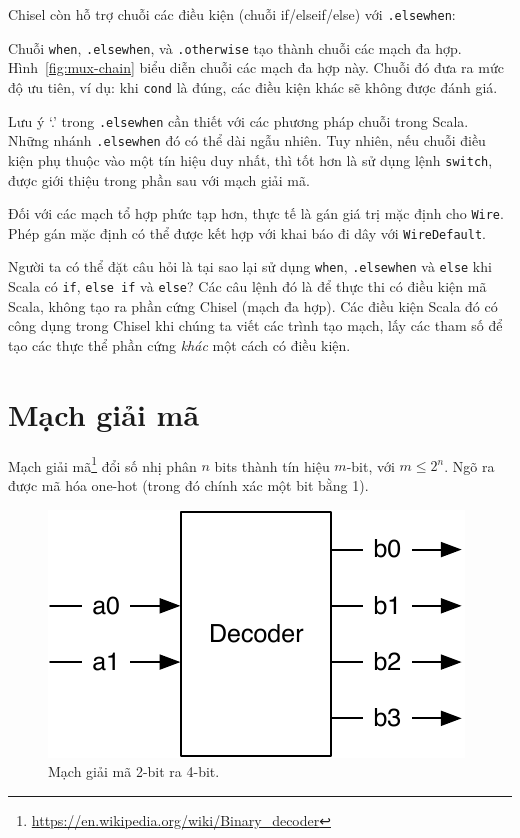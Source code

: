 \documentclass[%
    10pt,
    headinclude, footexclude,
    openright, %
    notitlepage,
    cleardoubleempty,
    headsepline,
    pointlessnumbers,
    bibtotoc, idxtotoc,
    ]{scrbook}
\newcommand{\code}[1]{{\small{\texttt{#1}}}}
\newcommand{\scale}{0.7}
\newcommand{\myref}[2]{\href{#1}{#2}}
\renewcommand{\myref}[2]{{#2}{\footnote{\url{#1}}}}
\begin{document}
Chisel còn hỗ trợ chuỗi các điều kiện (chuỗi if/elseif/else) với \code{.elsewhen}:


\noindent Chuỗi \code{when}, \code{.elsewhen}, và \code{.otherwise}
tạo thành chuỗi các mạch đa hợp. Hình~\ref{fig:mux-chain} biểu diễn chuỗi các mạch đa hợp này.
Chuỗi đó đưa ra mức độ ưu tiên, ví dụ: khi \code{cond} là đúng, các điều kiện khác sẽ không được đánh giá.

Lưu ý `.' trong \code{.elsewhen} cần thiết với các phương pháp chuỗi trong Scala.
Những nhánh \code{.elsewhen} đó có thể dài ngẫu nhiên.
Tuy nhiên, nếu chuỗi điều kiện phụ thuộc vào một tín hiệu duy nhất, thì tốt hơn
là sử dụng lệnh \code{switch}, được giới thiệu trong phần sau với mạch giải mã. 

Đối với các mạch tổ hợp phức tạp hơn, thực tế là gán giá trị mặc định 
cho \code{Wire}. Phép gán mặc định có thể được kết hợp với khai báo đi dây với \code{WireDefault}.


Người ta có thể đặt câu hỏi là tại sao lại sử dụng \code{when}, \code{.elsewhen} và \code{else} 
khi Scala có \code{if}, \code{else if} và \code{else}? Các câu lệnh đó là để thực thi 
có điều kiện mã Scala, không tạo ra phần cứng Chisel (mạch đa hợp).
Các điều kiện Scala đó có công dụng trong Chisel khi chúng ta viết các 
trình tạo mạch, lấy các tham số để tạo các thực thể phần cứng \emph{khác} một cách có điều kiện.

\section{Mạch giải mã}


\myref{https://en.wikipedia.org/wiki/Binary_decoder}{Mạch giải mã}
đổi số nhị phân $n$ bits thành tín hiệu $m$-bit, với $m \leq 2^n$.
Ngõ ra được mã hóa one-hot (trong đó chính xác một bit bằng 1).

\begin{figure}
  \centering
  \includegraphics[scale=\scale]{figures/decoder}
  \caption{Mạch giải mã 2-bit ra 4-bit.}
  \label{fig:decoder}
\end{figure}
\end{document}
